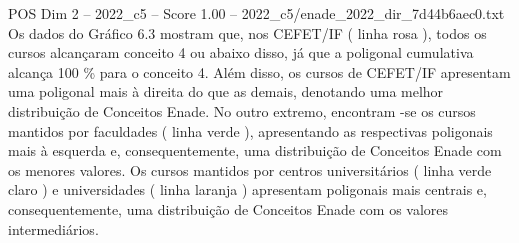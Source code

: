 \begin{textsample}{POS Dim 2 – 2022\_c5 – Score 1.00 – 2022\_c5/enade\_2022\_dir\_7d44b6aec0.txt}
Os dados do Gráfico 6.3 mostram que, nos CEFET/IF ( linha rosa ), todos os cursos alcançaram conceito 4 ou abaixo disso, já que a poligonal cumulativa alcança 100 \% para o conceito 4.
Além disso, os cursos de CEFET/IF apresentam uma poligonal mais à direita do que as demais, denotando uma melhor distribuição de Conceitos Enade.
No outro extremo, encontram -se os cursos mantidos por faculdades ( linha verde ), apresentando as respectivas poligonais mais à esquerda e, consequentemente, uma distribuição de Conceitos Enade com os menores valores.
Os cursos mantidos por centros universitários ( linha verde claro ) e universidades ( linha laranja ) apresentam poligonais mais centrais e, consequentemente, uma distribuição de Conceitos Enade com os valores intermediários.

\end{textsample}

